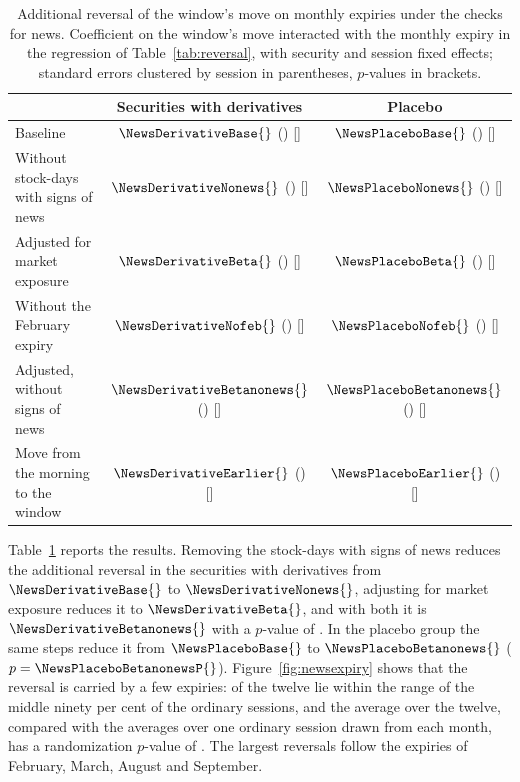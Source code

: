 \begin{table}[htbp]
\centering
\small
\caption{Additional reversal of the window's move on monthly expiries under the checks for
news. Coefficient on the window's move interacted with the monthly expiry in the regression of
Table~\ref{tab:reversal}, with security and session fixed effects; standard errors clustered by
session in parentheses, $p$-values in brackets.}
\label{tab:news}
\begin{tabular}{lcc}
\toprule
 & Securities with derivatives & Placebo \\
\midrule
Baseline & $\NewsDerivativeBase{}$ (\NewsDerivativeBaseSe{}) [\NewsDerivativeBaseP{}] &
  $\NewsPlaceboBase{}$ (\NewsPlaceboBaseSe{}) [\NewsPlaceboBaseP{}] \\
Without stock-days with signs of news & $\NewsDerivativeNonews{}$ (\NewsDerivativeNonewsSe{}) [\NewsDerivativeNonewsP{}] &
  $\NewsPlaceboNonews{}$ (\NewsPlaceboNonewsSe{}) [\NewsPlaceboNonewsP{}] \\
Adjusted for market exposure & $\NewsDerivativeBeta{}$ (\NewsDerivativeBetaSe{}) [\NewsDerivativeBetaP{}] &
  $\NewsPlaceboBeta{}$ (\NewsPlaceboBetaSe{}) [\NewsPlaceboBetaP{}] \\
Without the February expiry & $\NewsDerivativeNofeb{}$ (\NewsDerivativeNofebSe{}) [\NewsDerivativeNofebP{}] &
  $\NewsPlaceboNofeb{}$ (\NewsPlaceboNofebSe{}) [\NewsPlaceboNofebP{}] \\
Adjusted, without signs of news & $\NewsDerivativeBetanonews{}$ (\NewsDerivativeBetanonewsSe{}) [\NewsDerivativeBetanonewsP{}] &
  $\NewsPlaceboBetanonews{}$ (\NewsPlaceboBetanonewsSe{}) [\NewsPlaceboBetanonewsP{}] \\
\midrule
Move from the morning to the window & $\NewsDerivativeEarlier{}$ (\NewsDerivativeEarlierSe{}) [\NewsDerivativeEarlierP{}] &
  $\NewsPlaceboEarlier{}$ (\NewsPlaceboEarlierSe{}) [\NewsPlaceboEarlierP{}] \\
\bottomrule
\end{tabular}
\end{table}

Table~\ref{tab:news} reports the results. Removing the stock-days with signs of news reduces
the additional reversal in the securities with derivatives from $\NewsDerivativeBase{}$ to
$\NewsDerivativeNonews{}$, adjusting for market exposure reduces it to
$\NewsDerivativeBeta{}$, and with both it is $\NewsDerivativeBetanonews{}$ with a $p$-value of
\NewsDerivativeBetanonewsP{}. In the placebo group the same steps reduce it from
$\NewsPlaceboBase{}$ to $\NewsPlaceboBetanonews{}$ ($p = \NewsPlaceboBetanonewsP{}$).
Figure~\ref{fig:newsexpiry} shows that the reversal is carried by a few expiries:
\NewsExpiriesInrange{} of the twelve lie within the range of the middle ninety per cent of
the \NewsNormalSessions{} ordinary sessions, and the average over the twelve, compared with the
averages over one ordinary session drawn from each month, has a randomization $p$-value of
\NewsSessionriDerivative{}. The largest reversals follow the expiries of February, March,
August and September.

